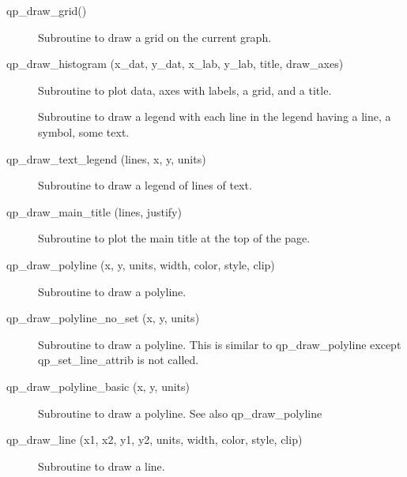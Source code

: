 \begin{description}
\label{r:qp.draw.grid}
\item[qp_draw_grid()] \Newline 
     Subroutine to draw a grid on the current graph.

\label{r:qp.draw.histogram}
\item[qp_draw_histogram (x_dat, y_dat, x_lab, y_lab, title, draw_axes)] \Newline 
     Subroutine to plot data, axes with labels, a grid, and a title.

\label{r:qp.draw.curve.legend}
\item[\protect\parbox{6in}{qp_draw_curve_legend (origin, text_offset, line_length, \\ 
\hspace*{2in}  line, symbol, text, draw_line, draw_symbol, draw_text) }] \Newline
Subroutine to draw a legend with each line in the legend having
  a line, a symbol, some text.

\label{r:qp.draw.text.legend}
\item[qp_draw_text_legend (lines, x, y, units)] \Newline 
Subroutine to draw a legend of lines of text.

\label{r:qp.draw.main.title}
\item[qp_draw_main_title (lines, justify)] \Newline 
     Subroutine to plot the main title at the top of the page.

\label{r:qp.draw.polyline}
\item[qp_draw_polyline (x, y, units, width, color, style, clip)] \Newline 
     Subroutine to draw a polyline.

\label{r:qp.draw.polyline.no.set}
\item[qp_draw_polyline_no_set (x, y, units)] \Newline 
Subroutine to draw a polyline.
This is similar to qp_draw_polyline except qp_set_line_attrib is not called.

\label{r:qp.draw.polyline.basic}
\item[qp_draw_polyline_basic (x, y, units)] \Newline 
     Subroutine to draw a polyline. See also qp_draw_polyline

\label{r:qp.draw.line}
\item[qp_draw_line (x1, x2, y1, y2, units, width, color, style, clip)] \Newline 
     Subroutine to draw a line.


\end{description}

